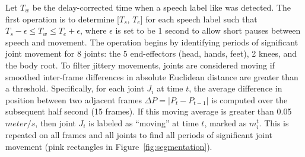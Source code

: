 



Let $T_w$ be the delay-corrected time when a speech label like  was detected.
The first operation is to determine [$T_s$, $T_e$] for each speech label such that $T_s - \epsilon \leq T_w \leq T_e + \epsilon$, where $\epsilon$ is set to be 1 second to allow short pauses between speech and movement.
%
The operation begins by identifying periods of significant joint movement for 8 joints: the 5 end-effectors (head, hands, feet), 2 knees, and the body root.
%
To filter jittery movements, joints are considered moving if smoothed inter-frame differences in absolute Euclidean distance are greater than a threshold.
%
Specifically, for each joint $J_i$ at time $t$, the average difference in position between two adjacent frames $\Delta P = |P_t-P_{t-1}|$ is computed over the subsequent half second (15 frames).
%
If this moving average is greater than 0.05$meter/s$, then joint $J_i$ is labeled as ``moving'' at time $t$, marked as $m_i^t$.
This is repeated on all frames and all joints to find all periods of significant joint movement (pink rectangles in Figure~\ref{fig:segmentation}).

